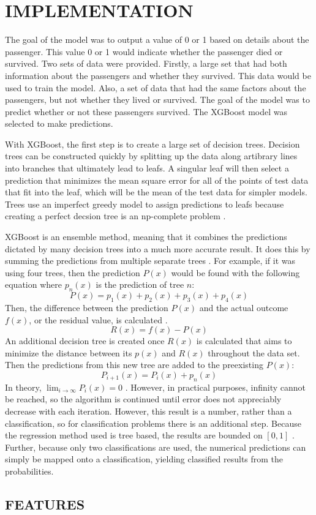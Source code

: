 \documentclass[12pt]{article}
\begin{document}
  \section{IMPLEMENTATION}
    The goal of the model was to output a value of 0 or 1 based on details about the passenger. This value 0 or 1 would indicate whether the passenger died or survived. Two sets of data were provided. Firstly, a large set that had both information about the passengers and whether they survived. This data would be used to train the model. Also, a set of data that had the same factors about the passengers, but not whether they lived or survived. The goal of the model was to predict whether or not these passengers survived. The XGBoost model was selected to make predictions.

    With XGBoost, the first step is to create a large set of decision trees. Decision trees can be constructed quickly by splitting up the data along artibrary lines into branches that ultimately lead to leafs. A singular leaf will then select a prediction that minimizes the mean square error for all of the points of test data that fit into the leaf, which will be the mean of the test data for simpler models. Trees use an imperfect greedy model to assign predictions to leafs because creating a perfect decsion tree is an np-complete problem \cite{two}.

    XGBoost is an ensemble method, meaning that it combines the predictions dictated by many decision trees into a much more accurate result. It does this by summing the predictions from multiple separate trees \cite{three}. For example, if it was using four trees, then the prediction $P(x)$ would be found with the following equation where $p_{n}(x)$ is the prediction of tree $n$:
    \begin{equation}
      P(x) = p_{1}(x) + p_{2}(x) + p_{3}(x) + p_{4}(x)
    \end{equation}
    Then, the difference between the prediction $P(x)$ and the actual outcome $f(x)$, or the residual value, is calculated \cite{three}.
    \begin{equation}
      R(x) = f(x) - P(x)
    \end{equation}
    An additional decision tree is created once $R(x)$ is calculated that aims to minimize the distance between its $p(x)$
    and $R(x)$ throughout the data set. Then the predictions from this new tree are added to the preexisting $P(x)$:
      \begin{equation}
        P_{i+1}(x) = P_i(x) + p_n(x)
      \end{equation}
    In theory, $\lim_{i \to \infty} P_i(x) = 0$ \cite{mason2000boosting}. However, in practical purposes, infinity cannot be reached, so the algorithm is continued until error does not appreciably decrease with each iteration. However, this result is a number, rather than a classification, so for classification problems there is an additional step. Because the regression method used is tree based, the results are bounded on $[0,1]$ \cite{classificationexplanation}. Further, because only two classifications are used, the numerical predictions can simply be mapped onto a classification, yielding classified results from the probabilities.

    \subsection{FEATURES}


    {}
    
  
\end{document}
